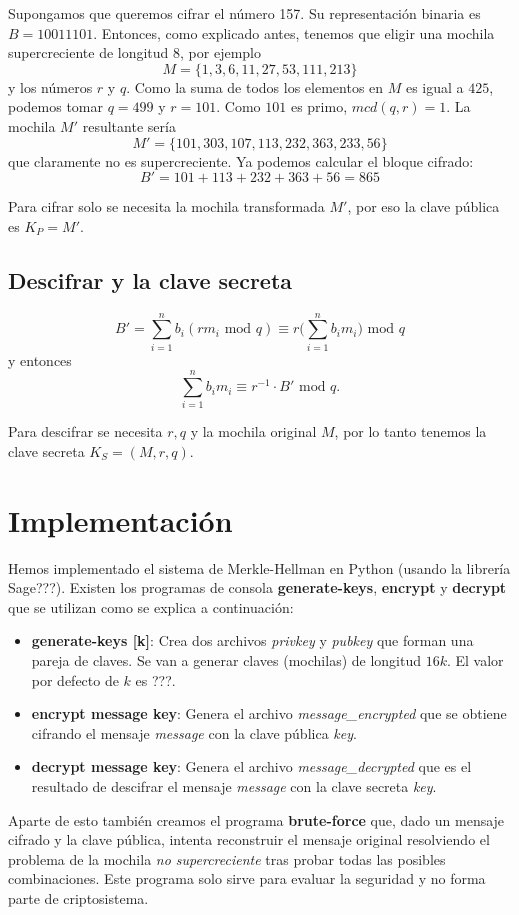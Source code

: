 \documentclass[12pt]{article}
\newenvironment{example}[1][Ejemplo]{\begin{trivlist}
\item[\hskip \labelsep {\bfseries #1}]}{\end{trivlist}}
\begin{document}
\begin{example}
Supongamos que queremos cifrar el número 157. Su representación binaria es $B = 10011101$. Entonces, como explicado antes, tenemos que eligir una mochila supercreciente de longitud $8$, por ejemplo
$$M = \{1, 3, 6, 11, 27, 53, 111, 213\}$$
y los números $r$ y $q$. Como la suma de todos los elementos en $M$ es igual a $425$, podemos tomar $q = 499$ y $r = 101$. Como $101$ es primo, $mcd(q,r) = 1$. La mochila $M'$ resultante sería
$$M' = \{101, 303, 107, 113, 232, 363, 233, 56\}$$
que claramente no es supercreciente. Ya podemos calcular el bloque cifrado:
$$B' = 101 + 113 + 232 + 363 + 56 = 865$$
\end{example}
Para cifrar solo se necesita la mochila transformada $M'$, por eso la clave pública es $K_P = M'$.

\subsection*{Descifrar y la clave secreta}

$$B' = \sum_{i=1}^nb_i(rm_i \text{ mod } q) \equiv r\big(\sum_{i=1}^nb_im_i\big)\text{ mod } q$$
y entonces
$$\sum_{i=1}^nb_im_i \equiv r^{-1} \cdot B' \text{ mod } q.$$

\begin{example}
\end{example}
Para descifrar se necesita $r, q$ y la mochila original $M$, por lo tanto tenemos la clave secreta $K_S = (M, r, q)$.

\section{Implementación}

Hemos implementado el sistema de Merkle-Hellman en Python (usando la librería Sage???). Existen los programas de consola \textbf{generate-keys}, \textbf{encrypt} y \textbf{decrypt} que se utilizan como se explica a continuación:

\begin{itemize}
	\item \textbf{generate-keys [k]}: Crea dos archivos \textit{privkey} y \textit{pubkey} que forman una pareja de claves. Se van a generar claves (mochilas) de longitud $16k$. El valor por defecto de $k$ es ???.
	\item \textbf{encrypt message key}: Genera el archivo \textit{message\_encrypted} que se obtiene cifrando el mensaje \textit{message} con la clave pública \textit{key}.
	\item \textbf{decrypt message key}: Genera el archivo \textit{message\_decrypted} que es el resultado de descifrar el mensaje \textit{message} con la clave secreta \textit{key}.
\end{itemize}
Aparte de esto también creamos el programa \textbf{brute-force} que, dado un mensaje cifrado y la clave pública, intenta reconstruir el mensaje original resolviendo el problema de la mochila \emph{no supercreciente} tras probar todas las posibles combinaciones. Este programa solo sirve para evaluar la seguridad y no forma parte de criptosistema.



 
 
\end{document}

